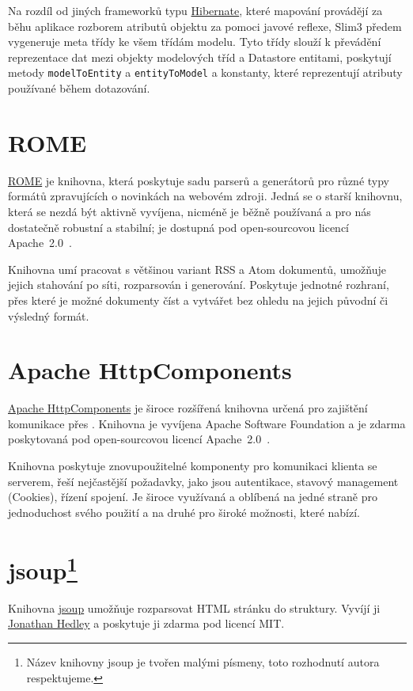 Na rozdíl od jiných  frameworků typu \href{http://www.hibernate.org/}{Hibernate}, které mapování provádějí za běhu aplikace rozborem atributů objektu za pomoci javové reflexe, Slim3 předem vygeneruje meta třídy ke všem třídám modelu.
Tyto třídy slouží k převádění reprezentace dat mezi objekty modelových tříd a Datastore entitami, poskytují metody \verb|modelToEntity| a \verb|entityToModel| a konstanty, které reprezentují atributy používané během dotazování.

\section{ROME}
\href{https://rometools.jira.com/wiki/display/ROME/Home}{ROME} je knihovna, která poskytuje sadu parserů a generátorů pro různé typy formátů zpravujících o novinkách na webovém zdroji.
Jedná se o starší knihovnu, která se nezdá být aktivně vyvíjena, nicméně je běžně používaná a pro nás dostatečně robustní a stabilní; je dostupná pod open-sourcovou licencí Apache~2.0~\cite{apache20}.

Knihovna umí pracovat s většinou variant RSS a Atom dokumentů, umožňuje jejich stahování po síti, rozparsován i generování.
Poskytuje jednotné rozhraní, přes které je možné dokumenty číst a vytvářet bez ohledu na jejich původní či výsledný formát.

\section{Apache HttpComponents}
\href{http://hc.apache.org/}{Apache HttpComponents} je široce rozšířená knihovna určená pro zajištění komunikace přes .
Knihovna je vyvíjena Apache Software Foundation a je zdarma poskytovaná pod open-sourcovou licencí Apache~2.0~\cite{apache20}.

Knihovna poskytuje znovupoužitelné komponenty pro komunikaci klienta se serverem, řeší nejčastější požadavky, jako jsou autentikace, stavový management (Cookies), řízení spojení.
Je široce využívaná a oblíbená na jedné straně pro jednoduchost svého použití a na druhé pro široké možnosti, které nabízí.

\section{\texorpdfstring{jsoup\footnote{Název knihovny jsoup je tvořen malými písmeny, toto rozhodnutí autora respektujeme.}}{jsoup}}
Knihovna \href{http://jsoup.org/}{jsoup} umožňuje rozparsovat HTML stránku do  struktury.
Vyvíjí ji \href{mailto:jonathan@hedley.net}{Jonathan Hedley} a poskytuje ji zdarma pod licencí MIT.

